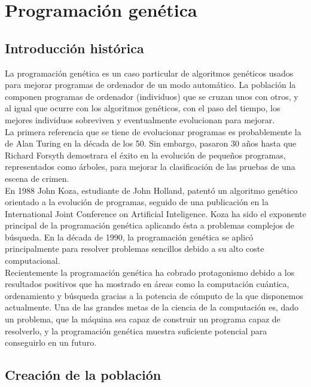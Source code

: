 \documentclass[12pt]{article} \usepackage[utf8x]{inputenc}
\begin{document}
\section{Programación genética}


\subsection{Introducción histórica}


La programación genética es un caso particular de algoritmos genéticos
usados para mejorar programas de ordenador de un modo automático.  La
población la componen programas de ordenador (individuos) que se
cruzan unos con otros, y al igual que ocurre con los algoritmos
genéticos, con el paso del tiempo, los mejores individuos sobreviven
y eventualmente evolucionan para mejorar. \\

La primera referencia que se tiene de evolucionar programas es
probablemente la de Alan Turing en la década de los 50. Sin embargo,
pasaron 30 años hasta que Richard Forsyth demostrara el éxito en la
evolución de pequeños programas, representados como árboles,
para mejorar la clasificación de las pruebas de una escena de crimen.\\

En 1988 John Koza, estudiante de John Holland, patentó un algoritmo
genético orientado a la evolución de programas, seguido de una
publicación en la International Joint Conference on Artificial
Inteligence. Koza ha sido el exponente principal de la programación
genética aplicando ésta a problemas complejos de búsqueda.
En la década de 1990, la programación genética se aplicó 
principalmente para resolver problemas sencillos debido a su alto 
coste computacional.\\

Recientemente la programación genética ha cobrado protagonismo debido 
a los resultados positivos que ha mostrado en áreas como la computación
cuántica, ordenamiento y búsqueda gracias a la potencia de cómputo de
la que disponemos actualmente. Una de las grandes metas de la ciencia 
de la computación es, dado un problema, que la máquina sea capaz de
construir un programa capaz de resolverlo, y la programación genética
muestra suficiente potencial para conseguirlo en un futuro.\\


\subsection {Creación de la población}
\end{document}
